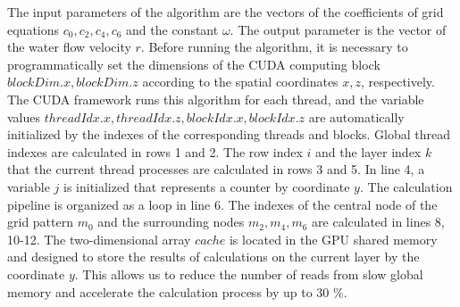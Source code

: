\documentclass{svproc}
\begin{document}
The input parameters of the algorithm are the vectors of the coefficients of grid equations  $c_0, c_2, c_4, c_6$ and the constant $\omega$. The output parameter is the vector of the water flow velocity $r$.
Before running the algorithm, it is necessary to programmatically set the dimensions of the CUDA computing block $blockDim.x, blockDim.z$ according to the spatial coordinates $x, z$, respectively.
The CUDA framework runs this algorithm for each thread, and the variable values $threadIdx.x, threadIdx.z, blockIdx.x, blockIdx.z$ are automatically initialized by the indexes of the corresponding threads and blocks.
Global thread indexes are calculated in rows 1 and 2.
The row index $i$ and the layer index $k$ that the current thread processes are calculated in rows 3 and 5.
In line 4, a variable $j$ is initialized that represents a counter by coordinate $y$.
The calculation pipeline is organized as a loop in line 6.
The indexes of the central node of the grid pattern $m_0$ and the surrounding nodes $m_2, m_4, m_6$ are calculated in lines 8, 10-12.
The two-dimensional array $cache$ is located in the GPU shared memory and designed to store the results of calculations on the current layer by the coordinate $y$.
This allows us to reduce the number of reads from slow global memory and accelerate the calculation process by up to 30 {$\%$}.
\end{document}
